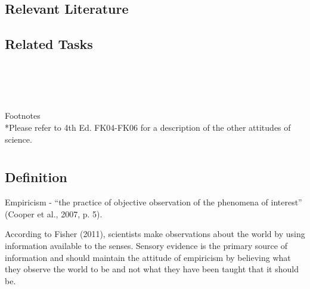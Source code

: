 \subsection{Relevant Literature}
\begin{refsection}
\nocite{test,alang2017police,clayton2018black}
\printbibliography[heading=none]
\end{refsection}
%
\subsection{Related Tasks}
\fourFKOne{}\\
\fourFKFour{}\\
\fourFKFive{}\\
\fourFKSix{}\\

Footnotes\\
*Please refer to 4th Ed. FK04-FK06 for a description of the other attitudes of science.\\
%
%
%
%
%
%
%
%
%
%
\section{\fourFKFour{}}
\subsection{Definition} 
Empiricism - ``the practice of objective observation of the phenomena of interest'' (Cooper et al., 2007, p. 5).

According to Fisher (2011), scientists make observations about the world by using information available to the senses. Sensory evidence is the primary source of information and should maintain the attitude of empiricism by believing what they observe the world to be and not what they have been taught that it should be.

